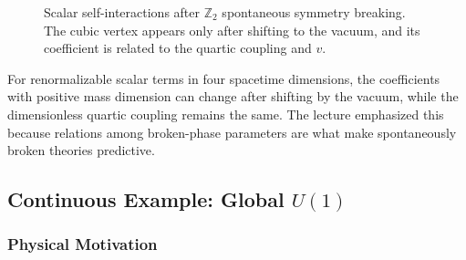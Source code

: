 \begin{figure}[ht]
\centering
{}
\hspace{1.2cm}
\caption{Scalar self-interactions after $\mathbb Z_2$ spontaneous symmetry breaking. The cubic vertex appears only after shifting to the vacuum, and its coefficient is related to the quartic coupling and $v$.}
\label{fig:lec15:z2-broken-scalar-vertices}
\end{figure}


For renormalizable scalar terms in four spacetime dimensions, the coefficients with positive mass dimension can change after shifting by the vacuum, while the dimensionless quartic coupling remains the same. The lecture emphasized this because relations among broken-phase parameters are what make spontaneously broken theories predictive.

\subsection{\texorpdfstring{Continuous Example: Global $U(1)$}{Continuous Example: Global U(1)}}\label{subsec:lec15:global-u1}

\subsubsection*{Physical Motivation}

